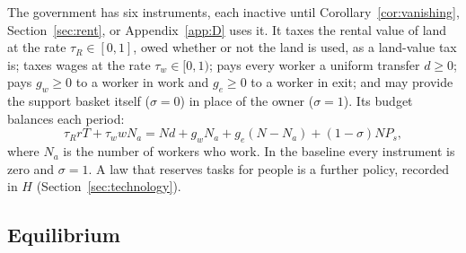 \documentclass[12pt]{article}
\theoremstyle{plain}
\theoremstyle{definition}
\theoremstyle{remark}
\begin{document}
The government has six instruments, each inactive until Corollary~\ref{cor:vanishing}, Section~\ref{sec:rent}, or Appendix~\ref{app:D} uses it. It taxes the rental value of land at the rate $\tau_R\in[0,1]$, owed whether or not the land is used, as a land-value tax is; taxes wages at the rate $\tau_w\in[0,1)$; pays every worker a uniform transfer $d\ge0$; pays $g_w\ge0$ to a worker in work and $g_e\ge0$ to a worker in exit; and may provide the support basket itself ($\sigma=0$) in place of the owner ($\sigma=1$). Its budget balances each period:
\begin{equation}\label{eq:govbudget}
\tau_RrT+\tau_wwN_a=Nd+g_wN_a+g_e(N-N_a)+(1-\sigma)NP_s,
\end{equation}
where $N_a$ is the number of workers who work. In the baseline every instrument is zero and $\sigma=1$. A law that reserves tasks for people is a further policy, recorded in $H$ (Section~\ref{sec:technology}).

\subsection{Equilibrium}\label{sec:eqdef}
\end{document}
